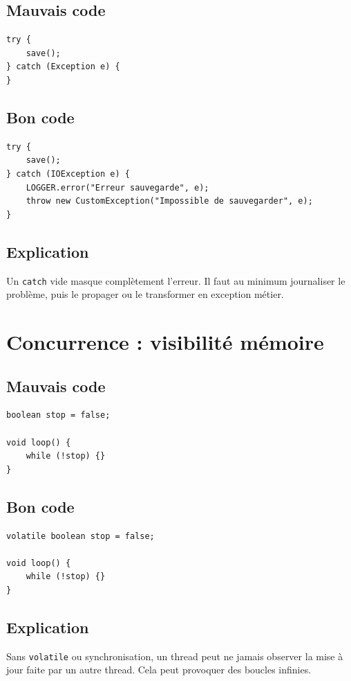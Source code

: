 \documentclass[a4paper,11pt]{report}
\begin{document}
\section{Mauvais code}
\begin{lstlisting}
try {
    save();
} catch (Exception e) {
}
\end{lstlisting}

\section{Bon code}
\begin{lstlisting}
try {
    save();
} catch (IOException e) {
    LOGGER.error("Erreur sauvegarde", e);
    throw new CustomException("Impossible de sauvegarder", e);
}
\end{lstlisting}

\section{Explication}
Un \texttt{catch} vide masque complètement l'erreur.
Il faut au minimum journaliser le problème, puis le propager ou le transformer en exception métier.

\chapter{Concurrence : visibilité mémoire}

\section{Mauvais code}
\begin{lstlisting}
boolean stop = false;

void loop() {
    while (!stop) {}
}
\end{lstlisting}

\section{Bon code}
\begin{lstlisting}
volatile boolean stop = false;

void loop() {
    while (!stop) {}
}
\end{lstlisting}

\section{Explication}
Sans \texttt{volatile} ou synchronisation, un thread peut ne jamais observer la mise à jour faite par un autre thread.
Cela peut provoquer des boucles infinies.
\end{document}
